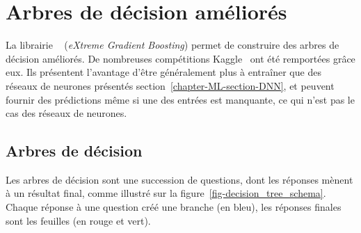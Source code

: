 \section{Arbres de décision améliorés}\label{chapter-ML-section-XGB}
La librairie
\XGBOOST~\cite{xgboost}
(\emph{eXtreme Gradient Boosting})
permet de construire des
arbres de décision améliorés.
De nombreuses compétitions Kaggle~\cite{kaggle_challenge} ont été remportées grâce eux.
Ils présentent l'avantage d'être généralement plus à entraîner que des réseaux de neurones présentés section~\ref{chapter-ML-section-DNN},
et peuvent fournir des prédictions même si une des entrées est manquante, ce qui n'est pas le cas des réseaux de neurones.
\subsection{Arbres de décision}
Les arbres de décision sont une succession de questions,
dont les réponses mènent à un résultat final,
comme illustré sur la figure~\ref{fig-decision_tree_schema}.
Chaque réponse à une question créé une \og branche \fg{} (en bleu),
les réponses finales sont les \og feuilles \fg{} (en rouge et vert).
